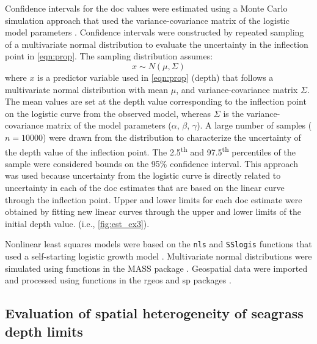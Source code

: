 \documentclass[letterpaper,12pt,oneside]{article}\usepackage[]{graphicx}\usepackage[]{color}
\begin{document}
Confidence intervals for the \ac{doc} values were estimated using a Monte Carlo simulation approach that used the variance-covariance matrix of the logistic model parameters \citep{Hilborn97}.  Confidence intervals were constructed by repeated sampling of a multivariate normal distribution to evaluate the uncertainty in the inflection point in \cref{eqn:prop}.  The sampling distribution assumes:
\begin{equation}
x \sim N(\mu, \Sigma)
\end{equation}
\noindent where $x$ is a predictor variable used in \cref{eqn:prop} (depth) that follows a multivariate normal distribution with mean $\mu$, and variance-covariance matrix $\Sigma$.  The mean values are set at the depth value corresponding to the inflection point on the logistic curve from the observed model, whereas $\Sigma$ is the variance-covariance matrix of the model parameters ($\alpha$, $\beta$, $\gamma$).  A large number of samples ($n = 10000$) were drawn from the distribution to characterize the uncertainty of the depth value of the inflection point.  The 2.5\textsuperscript{th} and 97.5\textsuperscript{th} percentiles of the sample were considered bounds on the 95\% confidence interval.  This approach was used because uncertainty from the logistic curve is directly related to uncertainty in each of the \ac{doc} estimates that are based on the linear curve through the inflection point. Upper and lower limits for each \ac{doc} estimate were obtained by fitting new linear curves through the upper and lower limits of the initial depth value. (i.e., \cref{fig:est_ex3}).

Nonlinear least squares models were based on the \texttt{nls} and \texttt{SSlogis} functions that used a self-starting logistic growth model \citep{Bates92,RDCT14}.  Multivariate normal distributions were simulated using functions in the MASS package \citep{Venables02}.  Geospatial data were imported and processed using functions in the rgeos and sp packages \citep{Bivand08,Bivand14}.  

\subsection{Evaluation of spatial heterogeneity of seagrass depth limits}
\end{document}
